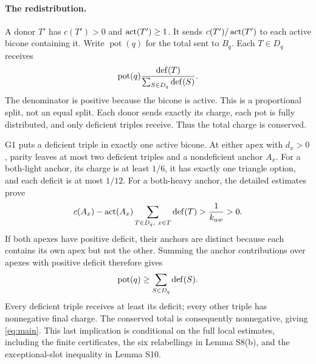 \paragraph{The redistribution.}
A donor $T'$ has $c(T')>0$ and $\operatorname{act}(T')\geq1$. It sends $c(T')/\operatorname{act}(T')$ to each active bicone containing it. Write $\operatorname{pot}(q)$ for the total sent to $B_q$. Each $T\in D_q$ receives
\[
 \operatorname{pot}(q)\frac{\operatorname{def}(T)}{\sum_{S\in D_q}\operatorname{def}(S)}.
\]
The denominator is positive because the bicone is active. This is a proportional split, not an equal split. Each donor sends exactly its charge, each pot is fully distributed, and only deficient triples receive. Thus the total charge is conserved.

G1 puts a deficient triple in exactly one active bicone. At either apex with $d_x>0$, parity leaves at most two deficient triples and a nondeficient anchor $A_x$. For a both-light anchor, its charge is at least $1/6$, it has exactly one triangle option, and each deficit is at most $1/12$. For a both-heavy anchor, the detailed estimates prove
\[
 c(A_x)-\operatorname{act}(A_x)\sum_{T\in D_q,\ x\in T}\operatorname{def}(T)>\frac1{k_{uw}}>0.
\]
If both apexes have positive deficit, their anchors are distinct because each contains its own apex but not the other. Summing the anchor contributions over apexes with positive deficit therefore gives
\[
 \operatorname{pot}(q)\geq\sum_{S\in D_q}\operatorname{def}(S).
\]
Every deficient triple receives at least its deficit; every other triple has nonnegative final charge. The conserved total is consequently nonnegative, giving \eqref{eq:main}. This last implication is conditional on the full local estimates, including the finite certificates, the six relabellings in Lemma S8(b), and the exceptional-slot inequality in Lemma S10.

